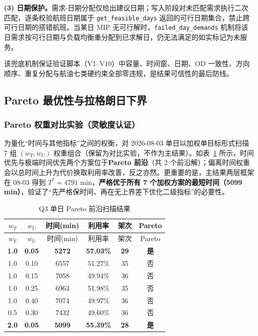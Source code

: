 \textbf{(3) 日期保护。}需求-日期分配仅给出建议日期；写入阶段对未匹配需求执行二次匹配，逐条校验航班日期属于 \texttt{get\_feasible\_days} 返回的可行日期集合，禁止跨可行日期的搭错航班。当某日 MIP 无可行解时，\texttt{failed\_day\_demands} 机制将该日需求按可行日期与负载均衡重分配到已求解日，仍无法满足的如实标记为未服务。

该兜底机制保证验证脚本（V1--V10）中容量、时间窗、日期、OD 一致性、方向顺序、重复分配与航油七类硬约束全部零违规，是结果可信性的最后防线。

\subsection{Pareto 最优性与拉格朗日下界}

\subsubsection{Pareto 权重对比实验（灵敏度认证）}\label{sec:q3_pareto}

为量化``时间与其他指标''之间的权衡，对 2026-08-03 单日以加权单目标形式扫描 7 组 $(w_T, w_{U})$ 权重组合（保留为对比实验，不作为主结果）。如表~\ref{tab:pareto} 所示，时间优先与极端时间优先两个方案位于\textbf{Pareto 前沿}\cite{pareto1906}（共 2 个前沿解）；偏离时间权重会以总时间上升为代价换取利用率改善，反之亦然。更重要的是，主结果两层框架在 08-03 得到 $T^* = 4791$ min，\textbf{严格优于所有 7 个加权方案的最短时间（5099 min）}，验证了``先严格保时间、再在无上界差下优化二级指标''的必要性。

\begin{longtable}{cccccc}
\caption{Q3 单日 Pareto 前沿扫描结果} \label{tab:pareto} \\
\toprule
$w_T$ & $w_{U}$ & 时间(min) & 利用率 & 架次 & Pareto \\
\midrule
\endfirsthead
\toprule
$w_T$ & $w_{U}$ & 时间(min) & 利用率 & 架次 & Pareto \\
\midrule
\endhead
\bottomrule
\endfoot
\bottomrule
\endlastfoot
\textbf{1.0} & \textbf{0.05} & \textbf{5272} & \textbf{57.03\%} & \textbf{29} & \textbf{是} \\
1.0 & 0.10 & 6557 & 51.27\% & 35 & 否 \\
1.0 & 0.15 & 7058 & 49.94\% & 36 & 否 \\
1.0 & 0.25 & 6963 & 51.98\% & 35 & 否 \\
1.0 & 0.40 & 7074 & 49.97\% & 36 & 否 \\
0.5 & 0.30 & 7432 & 49.60\% & 36 & 否 \\
\textbf{2.0} & \textbf{0.05} & \textbf{5099} & \textbf{55.39\%} & \textbf{28} & \textbf{是} \\
\end{longtable}

